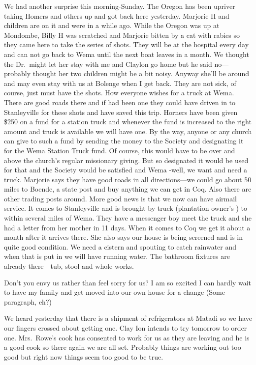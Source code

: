 \documentclass[
]{book}
\begin{document}
We had another surprise this morning-Sunday. The Oregon has been upriver taking Homers and others up and got back here yesterday. Marjorie H and children are on it and were in a while ago. While the Oregon was up at Mondombe, Billy H was scratched and Marjorie bitten by a cat with rabies so they came here to take the series of shots. They will be at the hospital every day and can not go back to Wema until the next boat leaves in a month. We thought the Dr.~might let her stay with me and Claylon go home but he said no---probably thought her two children might be a bit noisy. Anyway she'll be around and may even stay with us at Bolenge when I get back. They are not sick, of course, just must have the shots. How everyone wishes for a truck at Wema. There are good roads there and if had been one they could have driven in to Stanleyville for these shots and have saved this trip. Horners have been given \$250 on a fund for a station truck and whenever the fund is increased to the right amount and truck is available we will have one. By the way, anyone or any church can give to such a fund by sending the money to the Society and designating it for the Wema Station Truck fund. Of course, this would have to be over and above the church's regular missionary giving. But so designated it would be used for that and the Society would be satisfied and Wema -well, we want and need a truck. Marjorie says they have good roads in all directions---we could go about 50 miles to Boende, a state post and buy anything we can get in Coq. Also there are other trading posts around. More good news is that we now can have airmail service. It comes to Stanleyville and is brought by truck (plantation owner's ) to within several miles of Wema. They have a messenger boy meet the truck and she had a letter from her mother in 11 days. When it comes to Coq we get it about a month after it arrives there. She also says our house is being screened and is in quite good condition. We need a cistern and spouting to catch rainwater and when that is put in we will have running water. The bathroom fixtures are already there---tub, stool and whole works.

Don't you envy us rather than feel sorry for us? I am so excited I can hardly wait to have my family and get moved into our own house for a change (Some paragraph, eh?)

We heard yesterday that there is a shipment of refrigerators at Matadi so we have our fingers crossed about getting one. Clay Ion intends to try tomorrow to order one. Mrs.~Rowe's cook has consented to work for us as they are leaving and he is a good cook so there again we are all set. Probably things are working out too good but right now things seem too good to be true.
\end{document}
